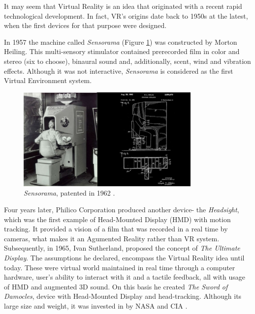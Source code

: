 It may seem that Virtual Reality is an idea that originated with a recent rapid technological development. In fact, VR's origins date back to 1950s at the latest, when the first devices for that purpose were designed.

In 1957 the machine called \textit{Sensorama} (Figure \ref{fig:sensorama})  was constructed by Morton Heiling. This multi-sensory stimulator contained prerecorded film in color and stereo (six to choose), binaural sound and, additionally, scent, wind and vibration effects. Although it was not interactive, \textit{Sensorama} is considered as the first Virtual Environment system.
\begin{figure}[h] 
\centering    
\includegraphics[width=0.8\textwidth]{Figs/sensorama.jpg}
\caption{\textit{Sensorama}, patented in 1962 \cite{Olszewski15}.}
\label{fig:sensorama}
\end{figure}
Four years later, Philico Corporation produced another device- the \textit{Headsight}, which was the first example of Head-Mounted Display (HMD) with motion tracking. It provided a vision of a film that was recorded in a real time by cameras, what makes it an Agumented Reality rather than VR system.
Subsequently, in 1965, Ivan Sutherland, proposed the concept of \textit{The Ultimate Display}. The assumptions he declared, encompass the Virtual Reality idea until today. These were virtual world maintained in real time through a computer hardware, user's ability to interact with it and a tactile feedback, all with usage of HMD and augmented 3D sound. On this basis he created      
\textit{The Sword of Damocles}, device with Head-Mounted Display and head-tracking. Although its large size and weight, it was invested in by NASA and CIA \cite{Olszewski15, Mandal13}.

